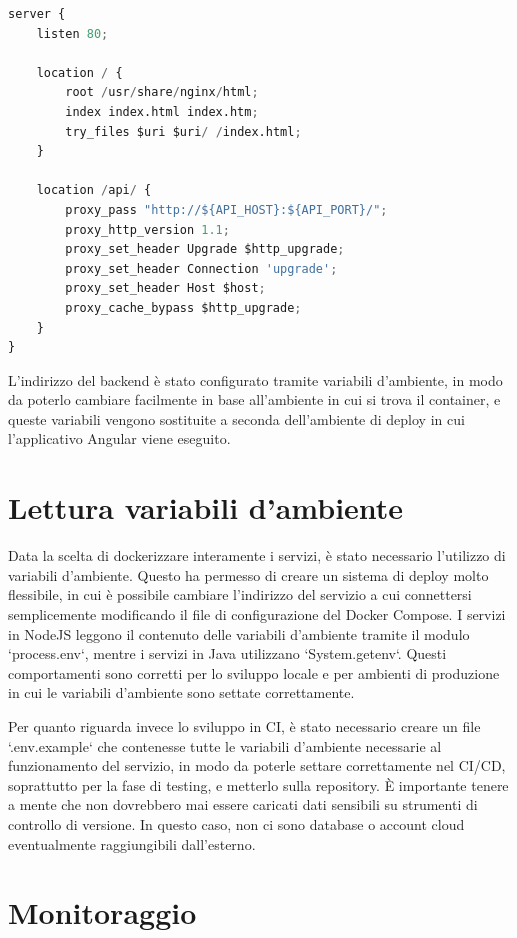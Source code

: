\begin{lstlisting}[language=Python, caption={Configurazione Nginx del front-end}, label=list:nginx_frontend]
server {
    listen 80;
    
    location / {
        root /usr/share/nginx/html;
        index index.html index.htm;
        try_files $uri $uri/ /index.html;
    }

    location /api/ {
        proxy_pass "http://${API_HOST}:${API_PORT}/";
        proxy_http_version 1.1;
        proxy_set_header Upgrade $http_upgrade;
        proxy_set_header Connection 'upgrade';
        proxy_set_header Host $host;
        proxy_cache_bypass $http_upgrade;
    }
}
\end{lstlisting}

L'indirizzo del backend è stato configurato tramite variabili d'ambiente, in modo da poterlo cambiare facilmente in base all'ambiente in cui si trova il container, e queste variabili vengono sostituite a seconda dell'ambiente di deploy in cui l'applicativo Angular viene eseguito.


\section{Lettura variabili d'ambiente}

Data la scelta di dockerizzare interamente i servizi, è stato necessario l'utilizzo di variabili d'ambiente. Questo ha permesso di creare un sistema di deploy molto flessibile, in cui è possibile cambiare l'indirizzo del servizio a cui connettersi semplicemente modificando il file di configurazione del Docker Compose. I servizi in NodeJS leggono il contenuto delle variabili d'ambiente tramite il modulo `process.env`, mentre i servizi in Java utilizzano `System.getenv`. Questi comportamenti sono corretti per lo sviluppo locale e per ambienti di produzione in cui le variabili d'ambiente sono settate correttamente.

Per quanto riguarda invece lo sviluppo in CI, è stato necessario creare un file `.env.example` che contenesse tutte le variabili d'ambiente necessarie al funzionamento del servizio, in modo da poterle settare correttamente nel CI/CD, soprattutto per la fase di testing, e metterlo sulla repository. È importante tenere a mente che non dovrebbero mai essere caricati dati sensibili su strumenti di controllo di versione. In questo caso, non ci sono database o account cloud eventualmente raggiungibili dall'esterno.

\section{Monitoraggio}

